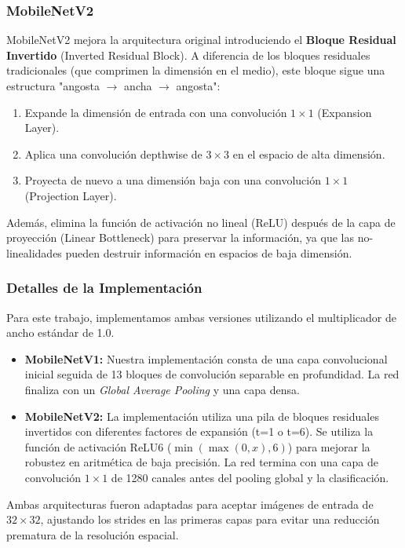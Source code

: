 \documentclass{pas}
\begin{document}
\subsubsection{MobileNetV2}

MobileNetV2 \cite{sandler2018mobilenetv2} mejora la arquitectura original introduciendo el \textbf{Bloque Residual Invertido} (Inverted Residual Block). A diferencia de los bloques residuales tradicionales (que comprimen la dimensión en el medio), este bloque sigue una estructura "angosta $\rightarrow$ ancha $\rightarrow$ angosta":
\begin{enumerate}
    \item Expande la dimensión de entrada con una convolución $1 \times 1$ (Expansion Layer).
    \item Aplica una convolución depthwise de $3 \times 3$ en el espacio de alta dimensión.
    \item Proyecta de nuevo a una dimensión baja con una convolución $1 \times 1$ (Projection Layer).
\end{enumerate}
Además, elimina la función de activación no lineal (ReLU) después de la capa de proyección (Linear Bottleneck) para preservar la información, ya que las no-linealidades pueden destruir información en espacios de baja dimensión.

\subsubsection{Detalles de la Implementación}

Para este trabajo, implementamos ambas versiones utilizando el multiplicador de ancho estándar de 1.0.
\begin{itemize}
    \item \textbf{MobileNetV1:} Nuestra implementación consta de una capa convolucional inicial seguida de 13 bloques de convolución separable en profundidad. La red finaliza con un \textit{Global Average Pooling} y una capa densa.
    \item \textbf{MobileNetV2:} La implementación utiliza una pila de bloques residuales invertidos con diferentes factores de expansión (t=1 o t=6). Se utiliza la función de activación ReLU6 ($\min(\max(0, x), 6)$) para mejorar la robustez en aritmética de baja precisión. La red termina con una capa de convolución $1 \times 1$ de 1280 canales antes del pooling global y la clasificación.
\end{itemize}
Ambas arquitecturas fueron adaptadas para aceptar imágenes de entrada de $32 \times 32$, ajustando los strides en las primeras capas para evitar una reducción prematura de la resolución espacial.
\end{document}
